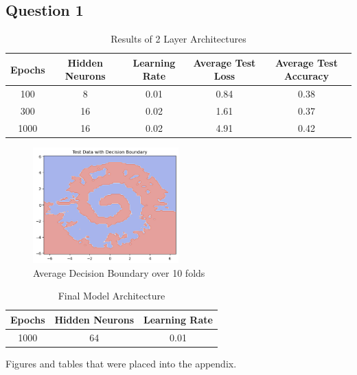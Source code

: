 \documentclass[runningheads]{llncs}
\begin{document}
\subsection{Question 1}

\begin{table}[ht]
  \centering
  \caption{Results of 2 Layer Architectures}
  \begin{tabular}{c c c c c}
    \toprule
    Epochs \quad & Hidden Neurons \quad & Learning Rate \quad & Average Test Loss \quad & Average Test Accuracy \\
    \midrule
    100 & 8  & 0.01 & 0.84 & 0.38 \\
    300 & 16  & 0.02 & 1.61 & 0.37 \\
    1000 & 16  & 0.02 & 4.91 & 0.42 \\
    \bottomrule
  \end{tabular}
  \label{tab:1A2LayerResults}
\end{table}

\begin{figure}[!htb]
  \centering
  \includegraphics[width=0.5\textwidth]{Question1Images/firstFFNNOutput.png}
  \caption{Average Decision Boundary over 10 folds}
  \label{fig:FirstFFNNDecision}
\end{figure}

\begin{table}[ht]
  \centering
  \caption{Final Model Architecture}
  \begin{tabular}{c c c}
    \toprule
    Epochs \quad & Hidden Neurons \quad & Learning Rate \\
    \midrule
    1000 & 64  & 0.01 \\
    \bottomrule
  \end{tabular}
  \label{tab:1AFinalModelArchitecture}
\end{table}

%





Figures and tables that were placed into the appendix.
\end{document}
